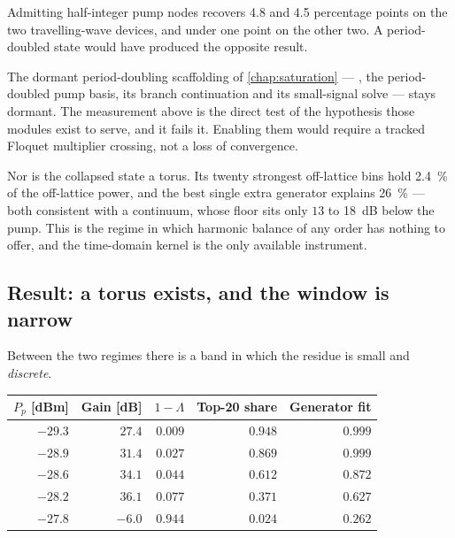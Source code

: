 Admitting half-integer pump nodes recovers \num{4.8} and \num{4.5} percentage
points on the two travelling-wave devices, and under one point on the other two.
A period-doubled state would have produced the opposite result.

\begin{caveat}
The dormant period-doubling scaffolding of \cref{chap:saturation} ---
, the period-doubled pump basis, its branch
continuation and its small-signal solve --- stays dormant. The measurement above
is the direct test of the hypothesis those modules exist to serve, and it fails
it. Enabling them would require a tracked Floquet multiplier crossing, not a
loss of convergence.
\end{caveat}

Nor is the collapsed state a torus. Its twenty strongest off-lattice bins hold
\SI{2.4}{\percent} of the off-lattice power, and the best single extra generator
explains \SI{26}{\percent} --- both consistent with a continuum, whose floor sits
only $13$ to \SI{18}{\dB} below the pump. This is the regime in which harmonic
balance of any order has nothing to offer, and the time-domain kernel is the
only available instrument.

\subsection{Result: a torus exists, and the window is narrow}

Between the two regimes there is a band in which the residue is small and
\emph{discrete}.

\begin{measured}
\begin{center}
\begin{tabular}{@{}r r r r r@{}}
\toprule
$P_p$ [\si{dBm}] & Gain [\si{\dB}] & $1-\Lambda$ & Top-20 share & Generator fit \\
\midrule
$-29.3$ & $27.4$ & $0.009$ & $0.948$ & $0.999$ \\
$-28.9$ & $31.4$ & $0.027$ & $0.869$ & $0.999$ \\
$-28.6$ & $34.1$ & $0.044$ & $0.612$ & $0.872$ \\
$-28.2$ & $36.1$ & $0.077$ & $0.371$ & $0.627$ \\
$-27.8$ & $-6.0$ & $0.944$ & $0.024$ & $0.262$ \\
\bottomrule
\end{tabular}
\end{center}
\end{measured}


